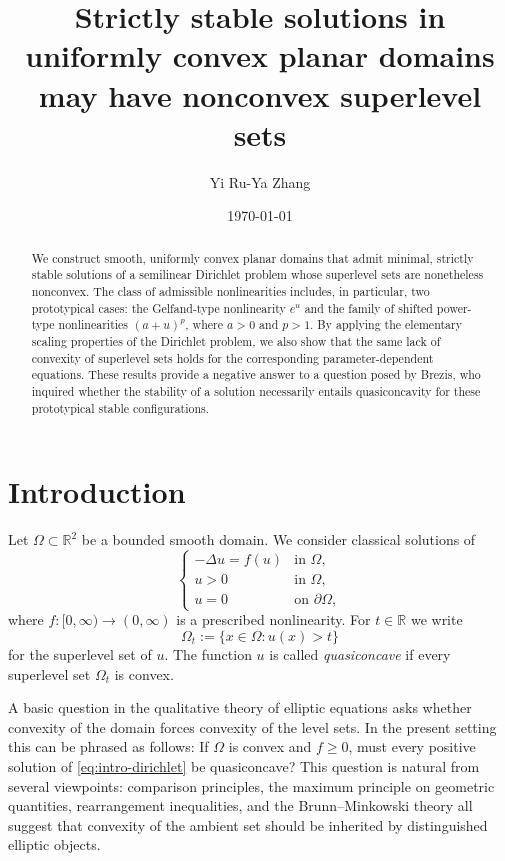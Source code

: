 \documentclass[reqno,12pt]{amsart}
\title[Stable solutions may have nonconvex superlevel sets]{Strictly stable solutions in uniformly convex planar domains may have nonconvex superlevel sets}
\author{Yi Ru-Ya Zhang}
\date{\today}
\numberwithin{equation}{section}
\theoremstyle{remark}
\begin{document}
\begin{abstract}
We construct smooth, uniformly convex planar domains that admit minimal, strictly stable solutions of a semilinear Dirichlet problem whose superlevel sets are nonetheless nonconvex. The class of admissible nonlinearities includes, in particular, two prototypical cases: the Gelfand-type nonlinearity $e^u$ and the family of shifted power-type nonlinearities $(a+u)^p$, where $a>0$ and $p>1$. By applying the elementary scaling properties of the Dirichlet problem, we also show that the same lack of convexity of superlevel sets holds for the corresponding parameter-dependent equations. These results provide a negative answer to a question posed by Brezis, who inquired whether the stability of a solution necessarily entails quasiconcavity for these prototypical stable configurations.
\end{abstract}

\maketitle
 

\section{Introduction}

Let $\Omega\subset \mathbb R^2$ be a bounded smooth domain.  We consider classical solutions of
\begin{equation}\label{eq:intro-dirichlet}
\begin{cases}
-\Delta u=f(u) & \text{in }\Omega,\\
u>0 & \text{in }\Omega,\\
u=0 & \text{on }\partial\Omega,
\end{cases}
\end{equation}
where $f:[0,\infty)\to(0,\infty)$ is a prescribed nonlinearity.  For
$t\in\mathbb R$ we write
$$
        \Omega_t:=\{x\in\Omega:u(x)>t\}
$$
for the superlevel set of $u$.  The function $u$ is called
\emph{quasiconcave} if every superlevel set $\Omega_t$ is convex.

A basic question in the qualitative theory of elliptic equations asks whether convexity of the domain forces convexity of the level sets.  In the present
setting this can be phrased as follows: If $\Omega$ is convex and $f\ge0$, must every positive solution of \eqref{eq:intro-dirichlet} be quasiconcave?  This
question is natural from several viewpoints: comparison principles, the maximum principle on geometric quantities, rearrangement inequalities, and the
Brunn--Minkowski theory all suggest that convexity of the ambient set should be inherited by distinguished elliptic objects.
\end{document}
